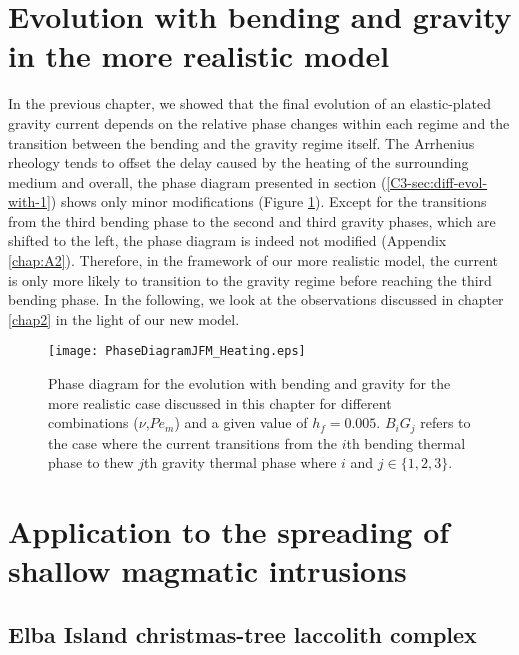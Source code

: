 \section{Evolution  with bending  and  gravity in  the more  realistic
  model}
\label{C4-sec:evol-with-bend}

In the  previous chapter,  we showed  that the  final evolution  of an
elastic-plated gravity  current depends on the  relative phase changes
within  each regime  and the  transition between  the bending  and the
gravity regime  itself.  The  Arrhenius rheology  tends to  offset the
delay caused by the heating of the surrounding medium and overall, the
phase  diagram  presented in  section  (\ref{C3-sec:diff-evol-with-1})
shows         only         minor         modifications         (Figure
\ref{C4-Phase_Diagram_Heating}).  Except for  the transitions from the
third bending phase to the second  and third gravity phases, which are
shifted  to  the  left,  the  phase diagram  is  indeed  not  modified
(Appendix  \ref{chap:A2}). Therefore,  in  the framework  of our  more
realistic model, the current is only  more likely to transition to the
gravity  regime  before reaching  the  third  bending phase.   In  the
following,  we   look  at   the  observations  discussed   in  chapter
\ref{chap2} in the light of our new model.

\begin{figure}[h!]
  \begin{center}
    \graphicspath{ {/Users/thorey/Documents/These/Projet/Refroidissement/Skin_Model/Figure/Figure_Heating/} }
    \texttt{[image: PhaseDiagramJFM\_Heating.eps]}
    \caption{Phase diagram for the  evolution with bending and gravity
      for  the  more realistic  case  discussed  in this  chapter  for
      different  combinations  ($\nu$,$Pe_m$)  and a  given  value  of
      $h_f =  0.005$.  $B_iG_j$ refers  to the case where  the current
      transitions from the  $i$th bending thermal phase  to thew $j$th
      gravity thermal phase where $i$ and $j \in \{1,2,3\}$.}
    \label{C4-Phase_Diagram_Heating}
  \end{center}
\end{figure}

\section{Application to the spreading of shallow magmatic intrusions}
\label{C4-sec:appl-spre-shall}

\subsection{Elba Island christmas-tree laccolith complex}
\label{C4-sec:appl-arrest-terr}


